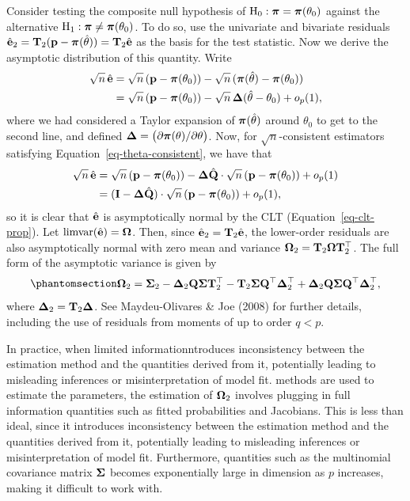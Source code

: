 \documentclass[
  letterpaper,
  DIV=11,
  numbers=noendperiod]{scrartcl}
\begin{document}
Consider testing the composite null hypothesis of
\(\text{H}_0: {\boldsymbol\pi} = {\boldsymbol\pi}(\theta_0)\) against the alternative
\(\text{H}_1:  {\boldsymbol\pi} \neq {\boldsymbol\pi}(\theta_0)\). To do so, use the univariate
and bivariate residuals
\(\hat{{\mathbf e}}_2 = {\mathbf T}_2({\mathbf p} - {\boldsymbol\pi}(\hat\theta)) = {\mathbf T}_2 \hat {{\mathbf e}}\) as the
basis for the test statistic. Now we derive the asymptotic distribution
of this quantity. Write \[
\begin{aligned}
\sqrt n \, \hat{{\mathbf e}}
&= \sqrt n \, ({\mathbf p} - {\boldsymbol\pi}(\theta_0)) - \sqrt n \, ({\boldsymbol\pi}(\hat\theta) - {\boldsymbol\pi}(\theta_0)) \\
&= \sqrt n \, ({\mathbf p} - {\boldsymbol\pi}(\theta_0)) - \sqrt n \, {\boldsymbol\Delta} (\hat\theta - \theta_0) + o_p(1),
\end{aligned}
\] where we had considered a Taylor expansion of \({\boldsymbol\pi}(\hat\theta)\)
around \(\theta_0\) to get to the second line, and defined
\({\boldsymbol\Delta} = \big(\partial {\boldsymbol\pi}(\theta) / \partial \theta \big)\). Now,
for \(\sqrt n\)-consistent estimators satisfying
Equation~\ref{eq-theta-consistent}, we have that \[
\begin{aligned}
\sqrt n \, \hat{{\mathbf e}}
&= \sqrt n \, ({\mathbf p} - {\boldsymbol\pi}(\theta_0)) -  {\boldsymbol\Delta} \hat{{\mathbf Q}}  \cdot \sqrt{n} \, ({\mathbf p} - {\boldsymbol\pi}(\theta_0)) + o_p(1) \\
&= ({\mathbf I} - {\boldsymbol\Delta} \hat{{\mathbf Q}}) \cdot \sqrt n \, ({\mathbf p} - {\boldsymbol\pi}(\theta_0)) + o_p(1),
\end{aligned}
\] so it is clear that \(\hat{{\mathbf e}}\) is asymptotically normal by the CLT
(Equation~\ref{eq-clt-prop}). Let
\(\operatorname{limvar}(\hat{{\mathbf e}}) = {\boldsymbol\Omega}\). Then, since
\(\hat{{\mathbf e}}_2 = {\mathbf T}_2 \hat{{\mathbf e}}\), the lower-order residuals are also
asymptotically normal with zero mean and variance
\({\boldsymbol\Omega}_2 = {\mathbf T}_2 {\boldsymbol\Omega} {\mathbf T}_2^\top\). The full form of the
asymptotic variance is given by
\begin{equation}\phantomsection\label{eq-omega2}{
\begin{aligned}
\bOmega_2 = 
  \bSigma_2 
  - \bDelta_{2} \bQ \bSigma \bT_2^\top
  - \bT_2 \bSigma \bQ^\top \bDelta_{2}^\top 
  + \bDelta_{2} \bQ \bSigma \bQ^\top \bDelta_{2}^\top,
\end{aligned}
}\end{equation} where \({\boldsymbol\Delta}_2 = {\mathbf T}_2 {\boldsymbol\Delta}\). See Maydeu-Olivares
\& Joe (2008) for further details, including the use of residuals from
moments of up to order \(q < p\).

In practice, when limited informationntroduces inconsistency between the
estimation method and the quantities derived from it, potentially
leading to misleading inferences or misinterpretation of model fit.
methods are used to estimate the parameters, the estimation of
\({\boldsymbol\Omega}_2\) involves plugging in full information quantities such as
fitted probabilities and Jacobians. This is less than ideal, since it
introduces inconsistency between the estimation method and the
quantities derived from it, potentially leading to misleading inferences
or misinterpretation of model fit. Furthermore, quantities such as the
multinomial covariance matrix \({\boldsymbol\Sigma}\) becomes exponentially large in
dimension as \(p\) increases, making it difficult to work with.
\end{document}
